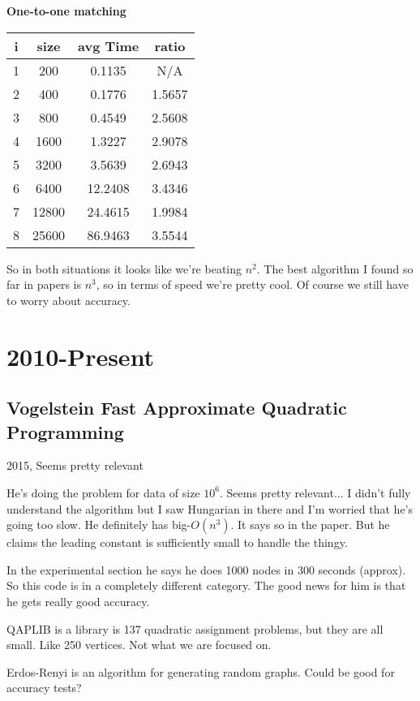 \documentclass{article}[11pt]
\begin{document}
\textbf{One-to-one matching} \\
\begin{tabular}{c|c|c|c|}
  i & size & avg Time & ratio \\
  \hline
  1 &    200 &  0.1135 &  N/A   \\ 
  2 &    400 &  0.1776 & 1.5657 \\
  3 &    800 &  0.4549 & 2.5608 \\
  4 &   1600 &  1.3227 & 2.9078 \\
  5 &   3200 &  3.5639 & 2.6943 \\
  6 &   6400 & 12.2408 & 3.4346 \\
  7 &  12800 & 24.4615 & 1.9984 \\
  8 &  25600 & 86.9463 & 3.5544 \\
\end{tabular}

So in both situations it looks like we're beating $n^2$. The best algorithm I found so far in papers is $n^3$, so in terms of speed we're pretty cool. Of course we still have to worry about accuracy.

\section{2010-Present}

\subsection{Vogelstein Fast Approximate Quadratic Programming \cite{Vogelstein2015}}

2015, Seems pretty relevant

He's doing the problem for data of size $10^6$. Seems pretty relevant...
I didn't fully understand the algorithm but I saw Hungarian in there and I'm worried that he's going too slow. He definitely has big-$O(n^3)$. It says so in the paper. But he claims the leading constant is sufficiently small to handle the thingy.

In the experimental section he says he does 1000 nodes in 300 seconds (approx). So this code is in a completely different category. The good news for him is that he gets really good accuracy.

QAPLIB is a library is 137 quadratic assignment problems, but they are all small. Like 250 vertices. Not what we are focused on.

Erdos-Renyi is an algorithm for generating random graphs. Could be good for accuracy tests?
\end{document}
